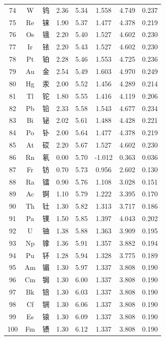 \documentclass[11pt,a4paper]{article}
\begin{document}
\begin{longtable}{|c|c|p{2.5cm}|c|c|c|c|c|}
		74 & W  & 钨 & 2.36 & 5.34 & 1.558  & 4.749  & 0.237 \\
		75 & Re & 铼 & 1.90 & 5.37 & 1.477  & 4.378  & 0.219 \\
		76 & Os & 锇 & 2.20 & 5.40 & 1.527  & 4.602  & 0.230 \\
		77 & Ir & 铱 & 2.20 & 5.43 & 1.527  & 4.602  & 0.230 \\
		78 & Pt & 铂 & 2.28 & 5.46 & 1.553  & 4.725  & 0.236 \\
		79 & Au & 金 & 2.54 & 5.49 & 1.603  & 4.970  & 0.249 \\
		80 & Hg & 汞 & 2.00 & 5.52 & 1.456  & 4.289  & 0.214 \\
		81 & Tl & 铊 & 1.80 & 5.55 & 1.416  & 4.119  & 0.206 \\
		82 & Pb & 铅 & 2.33 & 5.58 & 1.543  & 4.677  & 0.234 \\
		83 & Bi & 铋 & 2.02 & 5.61 & 1.488  & 4.428  & 0.221 \\
		84 & Po & 钋 & 2.00 & 5.64 & 1.477  & 4.378  & 0.219 \\
		85 & At & 砹 & 2.20 & 5.67 & 1.527  & 4.602  & 0.230 \\
		86 & Rn & 氡 & 0.00 & 5.70 & -1.012 & 0.363  & 0.036 \\
		87 & Fr & 钫 & 0.70 & 5.73 & 0.956  & 2.602  & 0.130 \\
		88 & Ra & 镭 & 0.90 & 5.76 & 1.108  & 3.028  & 0.151 \\
		89 & Ac & 锕 & 1.10 & 5.79 & 1.222  & 3.395  & 0.170 \\
		90 & Th & 钍 & 1.30 & 5.82 & 1.313  & 3.717  & 0.186 \\
		91 & Pa & 镤 & 1.50 & 5.85 & 1.397  & 4.043  & 0.202 \\
		92 & U  & 铀 & 1.38 & 5.88 & 1.363  & 3.909  & 0.195 \\
		93 & Np & 镎 & 1.36 & 5.91 & 1.357  & 3.882  & 0.194 \\
		94 & Pu & 钚 & 1.28 & 5.94 & 1.328  & 3.775  & 0.189 \\
		95 & Am & 镅 & 1.30 & 5.97 & 1.337  & 3.808  & 0.190 \\
		96 & Cm & 锔 & 1.30 & 6.00 & 1.337  & 3.808  & 0.190 \\
		97 & Bk & 锫 & 1.30 & 6.03 & 1.337  & 3.808  & 0.190 \\
		98 & Cf & 锎 & 1.30 & 6.06 & 1.337  & 3.808  & 0.190 \\
		99 & Es & 锿 & 1.30 & 6.09 & 1.337  & 3.808  & 0.190 \\
		100& Fm & 镄 & 1.30 & 6.12 & 1.337  & 3.808  & 0.190 \\

\end{longtable}
\end{document}
